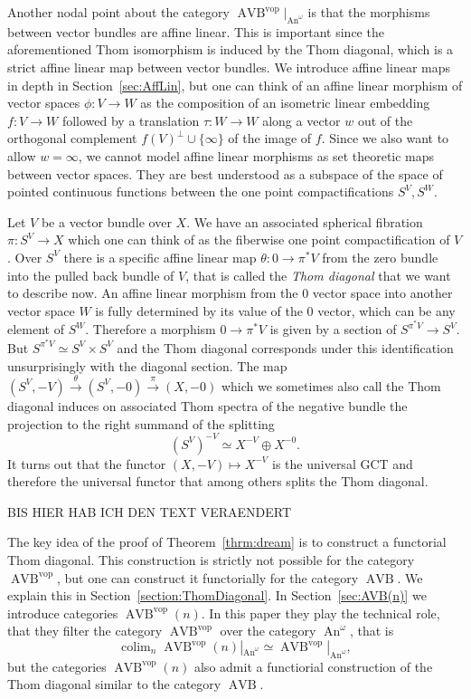 \documentclass{article}
\newcommand{\xto}{\xrightarrow}
\newcommand{\vop}{\mathrm{vop}}
\DeclareMathOperator{\AVB}{AVB}
\DeclareMathOperator{\An}{An}
\DeclareMathOperator*{\colim}{colim}
\begin{document}
Another nodal point about the category $\AVB^\vop|_{\An^\omega}$ is that the morphisms between 
vector bundles are affine linear. This is important since the aforementioned Thom isomorphism is 
induced by the Thom diagonal, which is a strict affine linear map between vector bundles.
We introduce affine linear maps in depth in Section~\ref{sec:AffLin}, but one can think of 
an affine linear morphism of vector spaces $\phi \colon V \to W$ as the composition 
of an isometric linear embedding $f \colon V \to W$ followed by a translation $\tau \colon W \to W$ along a vector 
$w$ out of the orthogonal complement $f(V)^\perp \cup \{\infty\}$ of the image of $f$.
Since we also want to allow $w = \infty$, we cannot model affine linear morphisms as set theoretic maps between vector spaces. 
They are best understood as a subspace of the space of pointed continuous functions between the one point compactifications $S^V,S^W$.

Let $V$ be a vector bundle over $X$. We have an associated spherical fibration $\pi \colon S^V \to X$
which one can think of as the fiberwise one point compactification of $V$. 
Over $S^V$ there is a specific affine linear map $\theta \colon 0 \to \pi^*V$ from the zero bundle into the 
pulled back bundle of $V$, that is called the \emph{Thom diagonal} that we want to describe now. 
An affine linear morphism from the $0$ vector space into another vector space $W$ is fully 
determined by its value of the $0$ vector, which can be any element of $S^W$.
Therefore a morphism $0 \to \pi^*V$ is given by a section of $S^{\pi^*V} \to S^V$.
But $S^{\pi^*V} \simeq S^V \times S^V$ and the Thom diagonal corresponds under this identification 
unsurprisingly with the diagonal section.
The map $(S^V, -V) \xto{\theta} (S^V, -0) \xto{\pi} (X, -0)$ which we sometimes also call the Thom diagonal induces on associated 
Thom spectra of the negative bundle the projection to the right summand of the splitting 
\[
  (S^V)^{-V} \simeq X^{-V} \oplus X^{-0}.
\]
It turns out that the functor $(X,-V) \mapsto X^{-V}$ is the universal GCT and therefore the universal functor 
that among others splits the Thom diagonal.

\medskip

BIS HIER HAB ICH DEN TEXT VERAENDERT

The key idea of the proof of Theorem~\ref{thrm:dream} is to construct a functorial Thom diagonal.
This construction is strictly not possible for the category $\AVB^\vop$, but one can construct it
functorially for the category $\AVB$. We explain this in Section~\ref{section:ThomDiagonal}.
In Section~\ref{sec:AVB(n)} we introduce categories $\AVB^\vop(n)$.
In this paper they play the technical role, that they filter the category $\AVB^\vop$ over the category $\An^\omega$, that is 
\[
\colim_n \AVB^\vop(n)|_{\An^\omega} \simeq \AVB^\vop|_{\An^\omega},    
\]
but the categories $\AVB^\vop(n)$ also admit a functiorial construction of the Thom diagonal similar to the category $\AVB$.
\end{document}
